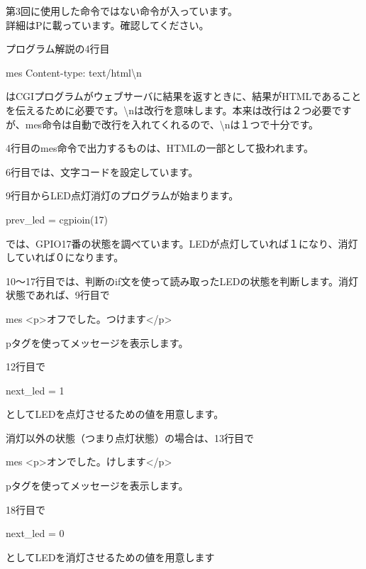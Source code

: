 第3回に使用した命令ではない命令が入っています。\\
詳細はP\pageref{P:gpio}に載っています。確認してください。

プログラム解説の4行目

mes {\textquotedbl}Content-type: text/html{\textbackslash}n{\textquotedbl}

はCGIプログラムがウェブサーバに結果を返すときに、結果がHTMLであることを伝えるために必要です。{\textbackslash}nは改行を意味します。本来は改行は２つ必要ですが、mes命令は自動で改行を入れてくれるので、{\textbackslash}nは１つで十分です。


\bigskip
\clearpage
4行目のmes命令で出力するものは、HTMLの一部として扱われます。

\bigskip

6行目では、文字コードを設定しています。

\bigskip

9行目からLED点灯消灯のプログラムが始まります。

prev\_led = cgpioin(17)

では、GPIO17番の状態を調べています。LEDが点灯していれば１になり、消灯していれば０になります。


\bigskip


10〜17行目では、判断のif文を使って読み取ったLEDの状態を判断します。消灯状態であれば、9行目で

mes
	{\textquotedbl}{\textless}p{\textgreater}オフでした。つけます{\textless}/p{\textgreater}{\textquotedbl}

pタグを使ってメッセージを表示します。

\bigskip

12行目で

next\_led = 1

としてLEDを点灯させるための値を用意します。

\bigskip

消灯以外の状態（つまり点灯状態）の場合は、13行目で

mes
	{\textquotedbl}{\textless}p{\textgreater}オンでした。けします{\textless}/p{\textgreater}{\textquotedbl}

pタグを使ってメッセージを表示します。

\bigskip

18行目で

next\_led = 0

としてLEDを消灯させるための値を用意します

\bigskip

